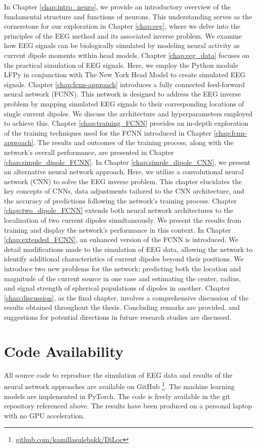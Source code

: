 \documentclass[a4paper, UKenglish, 11pt]{uiomaster}
\begin{document}
In Chapter \ref{chap:intro_neuro}, we provide an introductory overview of the fundamental structure and functions of neurons. This understanding serves as the cornerstone for our exploration in Chapter \ref{chap:eeg}, where we delve into the principles of the EEG method and its associated inverse problem. We examine how EEG signals can be biologically simulated by modeling neural activity as current dipole moments within head models.
Chapter \ref{chap:eeg_data} focuses on the practical simulation of EEG signals. Here, we employ the Python module LFPy in conjunction with The New York Head Model to create simulated EEG signals.
Chapter \ref{chap:fcnn-approach} introduces a fully connected feed-forward neural network (FCNN). This network is designed to address the EEG inverse problem by mapping simulated EEG signals to their corresponding locations of single current dipoles. We discuss the architecture and hyperparameters employed to achieve this.
Chapter \ref{chap:training_FCNN} provides an in-depth exploration of the training techniques used for the FCNN introduced in Chapter \ref{chap:fcnn-approach}. The results and outcomes of the training process, along with the network's overall performance, are presented in Chapter \ref{chap:simple_dipole_FCNN}.
In Chapter \ref{chap:simple_dipole_CNN}, we present an alternative neural network approach. Here, we utilize a convolutional neural network (CNN) to solve the EEG inverse problem. This chapter elucidates the key concepts of CNNs, data adjustments tailored to the CNN architecture, and the accuracy of predictions following the network's training process.
Chapter \ref{chap:two_dipole_FCNN} extends both neural network architectures to the localization of two current dipoles simultaneously. We present the results from training and display the network's performance in this context.
In Chapter \ref{chap:extended_FCNN}, an enhanced version of the FCNN is introduced. We detail modifications made to the simulation of EEG data, allowing the network to identify additional characteristics of current dipoles beyond their positions. We introduce two new problems for the network: predicting both the location and magnitude of the current source in one case and estimating the center, radius, and signal strength of spherical populations of dipoles in another.
Chapter \ref{chap:discussion}, as the final chapter, involves a comprehensive discussion of the results obtained throughout the thesis. Concluding remarks are provided, and suggestions for potential directions in future research studies are discussed.





\section{Code Availability}

All source code to reproduce the simulation of EEG data and results of the neural network approaches are available on GitHub
\footnote{\url{github.com/kamillasulebakk/DiLoc}}.
The machine learning models are implemented in PyTorch. The code is freely available in the git repository referenced above.
The results have been produced on a personal laptop with no GPU acceleration.
\end{document}
